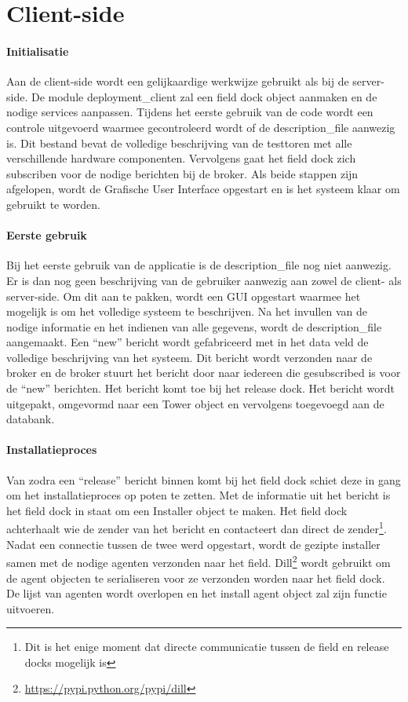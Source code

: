 \section{Client-side}
\paragraph{Initialisatie}
Aan de client-side wordt een gelijkaardige werkwijze gebruikt als bij de server-side.
De module deployment\_client zal een field dock object aanmaken en de nodige services aanpassen.
Tijdens het eerste gebruik van de code wordt een controle uitgevoerd waarmee gecontroleerd wordt of de description\_file aanwezig is.
Dit bestand bevat de volledige beschrijving van de testtoren met alle verschillende hardware componenten.
Vervolgens gaat het field dock zich subscriben voor de nodige berichten bij de broker.
Als beide stappen zijn afgelopen, wordt de Grafische User Interface opgestart en is het systeem klaar om gebruikt te worden.

\paragraph{Eerste gebruik}
Bij het eerste gebruik van de applicatie is de description\_file nog niet aanwezig.
Er is dan nog geen beschrijving van de gebruiker aanwezig aan zowel de client- als server-side.
Om dit aan te pakken, wordt een GUI opgestart waarmee het mogelijk is om het volledige systeem te beschrijven.
Na het invullen van de nodige informatie en het indienen van alle gegevens, wordt de description\_file aangemaakt.
Een ``new'' bericht wordt gefabriceerd met in het data veld de volledige beschrijving van het systeem.
Dit bericht wordt verzonden naar de broker en de broker stuurt het bericht door naar iedereen die gesubscribed is voor de ``new'' berichten.
Het bericht komt toe bij het release dock.
Het bericht wordt uitgepakt, omgevormd naar een Tower object en vervolgens toegevoegd aan de databank.

\paragraph{Installatieproces}
Van zodra een ``release'' bericht binnen komt bij het field dock schiet deze in gang om het installatieproces op poten te zetten.
Met de informatie uit het bericht is het field dock in staat om een Installer object te maken.
Het field dock achterhaalt wie de zender van het bericht en contacteert dan direct de zender\footnote{Dit is het enige moment dat directe communicatie tussen de field en release docks mogelijk is}.
Nadat een connectie tussen de twee werd opgestart, wordt de gezipte installer samen met de nodige agenten verzonden naar het field.
Dill\footnote{\url{https://pypi.python.org/pypi/dill}} wordt gebruikt om de agent objecten te serialiseren voor ze verzonden worden naar het field dock.
De lijst van agenten wordt overlopen en het install agent object zal zijn functie uitvoeren.

